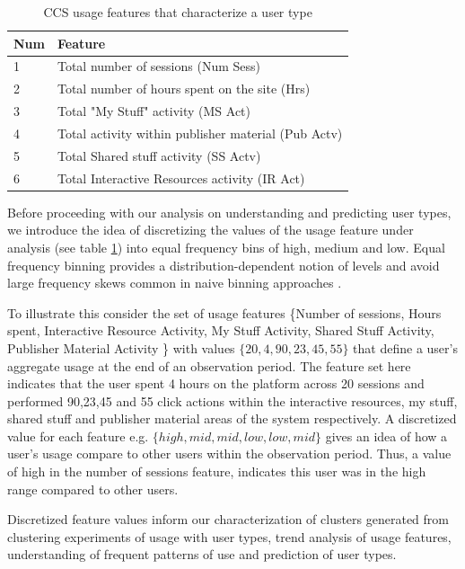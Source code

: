 \documentclass{acm_proc_article-sp}
\begin{document}
\begin{table}

\centering
\caption{CCS usage features that characterize a user type}
\label{usagefeatures}
\begin{tabular}{|l|l|} 
\hline
Num & Feature \\ \hline
1 & Total number of sessions (Num Sess) \\ \hline
2 & Total number of hours spent on the site (Hrs) \\ \hline
3 & Total "My Stuff" activity (MS Act) \\ \hline
4 & Total activity within publisher material (Pub Actv)\\ \hline
5 & Total Shared stuff activity (SS Actv) \\ \hline
6 & Total Interactive Resources activity (IR Act)	\\ \hline
\end{tabular}
\end{table}
Before proceeding with our analysis on understanding and predicting user types, we introduce the idea of discretizing the values of the usage feature under analysis (see table \ref{usagefeatures}) into equal frequency bins of high, medium and low. Equal frequency binning provides a distribution-dependent notion of levels and avoid large frequency skews common in naive binning approaches \cite{han2006data}.

 To illustrate this consider the set of usage features \{Number of sessions, Hours spent, Interactive Resource Activity, My Stuff Activity, Shared Stuff Activity, Publisher Material Activity \} with values $\{20,4,90,23,45,55 \}$ that define a user's aggregate usage at the end of an observation period. The feature set here indicates that the user spent 4 hours on the platform across 20 sessions and performed 90,23,45 and 55 click actions within the interactive resources, my stuff, shared stuff and publisher material areas of the system respectively. A discretized value for each feature e.g. $\{high,mid,mid,low,low, mid\}$ gives an idea of how a user's usage compare to other users within the observation period. Thus, a value of high in the number of sessions feature, indicates this user was in the high range compared to other users.
 
 Discretized feature values inform our characterization of clusters generated from  clustering experiments of usage  with user types, trend analysis of usage features, understanding of frequent patterns of use and prediction of user types. 
 
\end{document}
